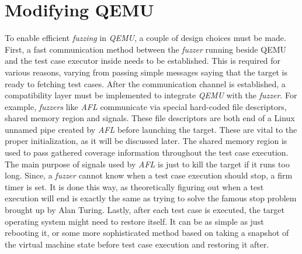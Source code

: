 \cleardoublepage
\section{Modifying QEMU} \label{chap:qemu}

To enable efficient \textit{fuzzing} in \textit{QEMU}, a couple of design choices must be made. First, a fast communication method between the \textit{fuzzer} running beside QEMU and the test case executor inside needs to be established. This is required for various reasons, varying from passing simple messages saying that the target is ready to fetching test cases. After the communication channel is established, a compatibility layer must be implemented to integrate \textit{QEMU} with the \textit{fuzzer}. For example, \textit{fuzzers} like \textit{AFL} communicate via special hard-coded file descriptors, shared memory region and signals. These file descriptors are both end of a Linux unnamed pipe created by \textit{AFL} before launching the target. These are vital to the proper initialization, as it will be discussed later. The shared memory region is used to pass gathered coverage information throughout the test case execution. The main purpose of signals used by \textit{AFL} is just to kill the target if it runs too long. Since, a \textit{fuzzer} cannot know when a test case execution should stop, a firm timer is set. It is done this way, as theoretically figuring out when a test execution will end is exactly the same as trying to solve the famous stop problem brought up by Alan Turing. Lastly, after each test case is executed, the target operating system might need to restore itself. It can be as simple as just rebooting it, or some more sophisticated method based on taking a snapshot of the virtual machine state before test case execution and restoring it after.

